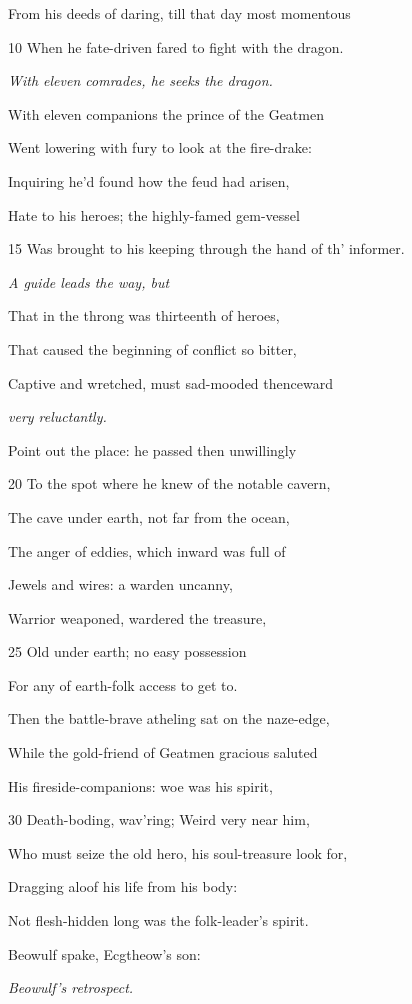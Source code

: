 From his deeds of daring, till that day most momentous

10
When he fate-driven fared to fight with the dragon.

\emph{With eleven comrades,
he seeks the
dragon.}

With eleven companions the prince of the Geatmen

Went lowering with fury to look at the fire-drake:

Inquiring he’d found how the feud had arisen,

Hate to his heroes; the highly-famed gem-vessel

15
Was brought to his keeping through the hand of th’ informer.

\emph{A guide leads the
way, but}

That in the throng was thirteenth of heroes,

That caused the beginning of conflict so bitter,

Captive and wretched, must sad-mooded thenceward

\emph{very reluctantly.}

Point out the place: he passed then unwillingly

20
To the spot where he knew of the notable cavern,

The cave under earth, not far from the ocean,

The anger of eddies, which inward was full of

Jewels and wires: a warden uncanny,

Warrior weaponed, wardered the treasure,

25
Old under earth; no easy possession

For any of earth-folk access to get to.

Then the battle-brave atheling sat on the naze-edge,

While the gold-friend of Geatmen gracious saluted

His fireside-companions: woe was his spirit,

30
Death-boding, wav’ring; Weird very near him,

Who must seize the old hero, his soul-treasure look for,

Dragging aloof his life from his body:

Not flesh-hidden long was the folk-leader’s spirit.

Beowulf spake, Ecgtheow’s son:

\emph{Beowulf’s retrospect.}

